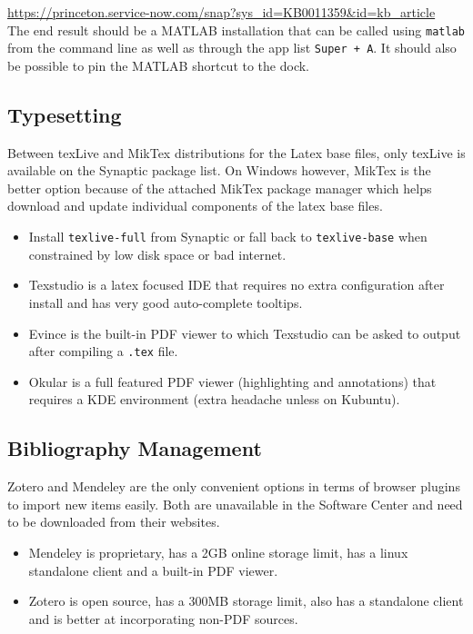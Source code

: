 \documentclass[12pt,letterpaper]{article}
\begin{document}
\url{https://princeton.service-now.com/snap?sys_id=KB0011359&id=kb_article}\\

The end result should be a MATLAB installation that can be called using \texttt{matlab} from the command line as well as through the app list \texttt{Super + A}. It should also be possible to pin the MATLAB shortcut to the dock.

\subsection{Typesetting}

Between texLive and MikTex distributions for the Latex base files, only texLive is available on the Synaptic package list. On Windows however, MikTex is the better option because of the attached MikTex package manager which helps download and update individual components of the latex base files.

\begin{itemize}
	\item Install \texttt{texlive-full} from Synaptic or fall back to \texttt{texlive-base} when constrained by low disk space or bad internet.
	\item Texstudio is a latex focused IDE that requires no extra configuration after install and has very good auto-complete tooltips.
	\item Evince is the built-in PDF viewer to which Texstudio can be asked to output after compiling a \texttt{.tex} file. 
	\item Okular is a full featured PDF viewer (highlighting and annotations) that requires a KDE environment (extra headache unless on Kubuntu).
\end{itemize} 


\subsection{Bibliography Management}

Zotero and Mendeley are the only convenient options in terms of browser plugins to import new items easily. Both are unavailable in the Software Center and need to be downloaded from their websites.

\begin{itemize}
	\item Mendeley is proprietary, has a 2GB online storage limit, has a linux standalone client and a built-in PDF viewer.
	\item Zotero is open source, has a 300MB storage limit, also has a standalone client and is better at incorporating non-PDF sources.
\end{itemize}
\end{document}
